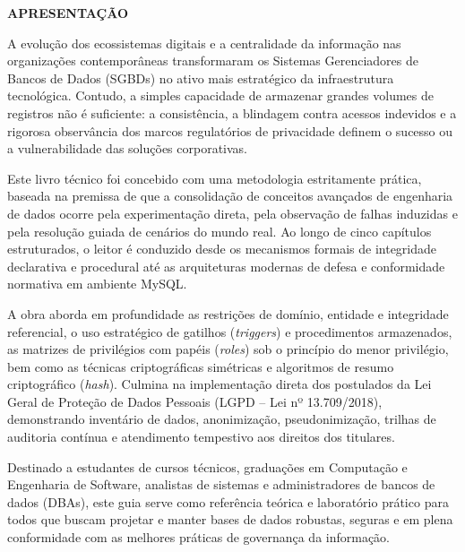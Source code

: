\documentclass[12pt,a4paper]{article}
\begin{document}
\begin{center}
\textbf{\fontsize{12}{14}\selectfont APRESENTAÇÃO}
\end{center}

\vspace{1.2em}

A evolução dos ecossistemas digitais e a centralidade da informação nas organizações contemporâneas transformaram os Sistemas Gerenciadores de Bancos de Dados (SGBDs) no ativo mais estratégico da infraestrutura tecnológica. Contudo, a simples capacidade de armazenar grandes volumes de registros não é suficiente: a consistência, a blindagem contra acessos indevidos e a rigorosa observância dos marcos regulatórios de privacidade definem o sucesso ou a vulnerabilidade das soluções corporativas.

Este livro técnico foi concebido com uma metodologia estritamente prática, baseada na premissa de que a consolidação de conceitos avançados de engenharia de dados ocorre pela experimentação direta, pela observação de falhas induzidas e pela resolução guiada de cenários do mundo real. Ao longo de cinco capítulos estruturados, o leitor é conduzido desde os mecanismos formais de integridade declarativa e procedural até as arquiteturas modernas de defesa e conformidade normativa em ambiente MySQL.

A obra aborda em profundidade as restrições de domínio, entidade e integridade referencial, o uso estratégico de gatilhos (\textit{triggers}) e procedimentos armazenados, as matrizes de privilégios com papéis (\textit{roles}) sob o princípio do menor privilégio, bem como as técnicas criptográficas simétricas e algoritmos de resumo criptográfico (\textit{hash}). Culmina na implementação direta dos postulados da Lei Geral de Proteção de Dados Pessoais (LGPD -- Lei nº 13.709/2018), demonstrando inventário de dados, anonimização, pseudonimização, trilhas de auditoria contínua e atendimento tempestivo aos direitos dos titulares.

Destinado a estudantes de cursos técnicos, graduações em Computação e Engenharia de Software, analistas de sistemas e administradores de bancos de dados (DBAs), este guia serve como referência teórica e laboratório prático para todos que buscam projetar e manter bases de dados robustas, seguras e em plena conformidade com as melhores práticas de governança da informação.

\vspace{3.0em}
\end{document}
